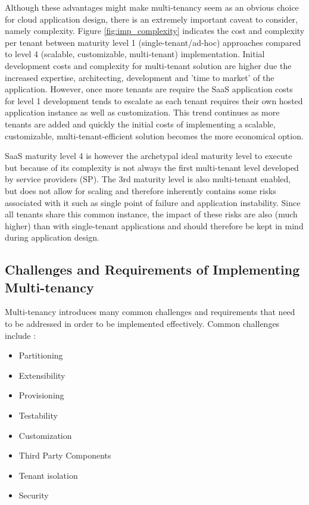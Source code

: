 Although these advantages might make multi-tenancy seem as an obvious choice for cloud application design, there is an extremely important caveat to consider, namely complexity. Figure \ref{fig:imp_complexity} indicates the cost and complexity per tenant between maturity level 1 (single-tenant/ad-hoc) approaches compared to level 4 (scalable, customizable, multi-tenant) implementation. Initial development costs and complexity for multi-tenant solution are higher due the increased expertise, architecting, development and 'time to market' of the application. However, once more tenants are require the SaaS application costs for level 1 development tends to escalate as each tenant requires their own hosted application instance as well as customization. This trend continues as more tenants are added and quickly the initial costs of implementing a scalable, customizable, multi-tenant-efficient solution becomes the more economical option.



SaaS maturity level 4 is however the archetypal ideal maturity level to execute but because of its complexity is not always the first multi-tenant level developed by service providers (SP). The 3rd maturity level is also multi-tenant enabled, but does not allow for scaling and therefore inherently contains some risks associated with it such as single point of failure and application instability. Since all tenants share this common instance, the impact of these risks are also (much higher) than with single-tenant applications and should therefore be kept in mind during application design.

\subsection{Challenges and Requirements of Implementing Multi-tenancy}

Multi-tenancy introduces many common challenges and requirements that need to be addressed in order to be implemented effectively. Common challenges include \cite{Betts2012-ad}:

\begin{itemize}
\item Partitioning
\item Extensibility
\item Provisioning
\item Testability
\item Customization
\item Third Party Components
\item Tenant isolation
\item Security
\end{itemize}

